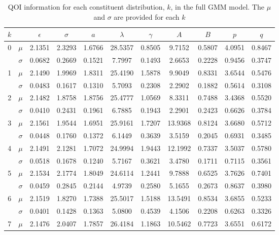 \begin{table}[ht]
	\centering
	\caption{QOI information for each constituent distribution, $k$, in the full GMM model.  The $\mu$ and $\sigma$ are provided for each $k$}
  \label{tbl:sw_all_gmm_parameters}
  \begin{tabular}{ccccccccccc}
    \hline
    $k$ & & $\epsilon$ & $\sigma$ & $a$ & $\lambda$ & $\gamma$ & $A$ & $B$ & $p$ & $q$\\
    \hline
    0 & $\mu$     & 2.1351 & 2.3293 & 1.6766 & 28.5357 & 0.8505 &  9.7152 & 0.5807 & 4.0951 & 0.8467\\
      & $\sigma$  & 0.0682 & 0.2669 & 0.1521 &  7.7997 & 0.1493 &  2.6653 & 0.2228 & 0.9456 & 0.3747\\
    1 & $\mu$     & 2.1490 & 1.9969 & 1.8311 & 25.4190 & 1.5878 &  9.9049 & 0.8331 & 3.6544 & 0.5476\\
      & $\sigma$  & 0.0483 & 0.1617 & 0.1310 &  5.7093 & 0.2308 &  2.2902 & 0.1882 & 0.5614 & 0.3108\\
    2 & $\mu$     & 2.1482 & 1.8758 & 1.8756 & 25.4777 & 1.0569 &  8.3311 & 0.7488 & 3.4368 & 0.5520\\
      & $\sigma$  & 0.0410 & 0.2431 & 0.1961 &  6.7885 & 0.1943 &  2.2901 & 0.2423 & 0.6626 & 0.3784\\
    3 & $\mu$     & 2.1561 & 1.9544 & 1.6951 & 25.9161 & 1.7207 & 13.9368 & 0.8124 & 3.6680 & 0.5712\\
      & $\sigma$  & 0.0448 & 0.1760 & 0.1372 &  6.1449 & 0.3639 &  3.5159 & 0.2045 & 0.6931 & 0.3485\\
    4 & $\mu$     & 2.1491 & 2.1281 & 1.7072 & 24.9994 & 1.9443 & 12.1992 & 0.7337 & 3.5037 & 0.5780\\
      & $\sigma$  & 0.0518 & 0.1678 & 0.1240 &  5.7167 & 0.3621 &  3.4780 & 0.1711 & 0.7115 & 0.3561\\
    5 & $\mu$     & 2.1534 & 2.1774 & 1.8049 & 24.6114 & 1.2441 &  9.7888 & 0.6525 & 3.7626 & 0.7401\\
      & $\sigma$  & 0.0459 & 0.2845 & 0.2144 &  4.9739 & 0.2580 &  5.1655 & 0.2673 & 0.8637 & 0.3980\\
    6 & $\mu$     & 2.1519 & 1.8270 & 1.7388 & 25.5017 & 1.5188 & 13.5491 & 0.8534 & 3.6855 & 0.5233\\
      & $\sigma$  & 0.0401 & 0.1428 & 0.1363 &  5.0800 & 0.4539 &  4.1506 & 0.2208 & 0.6263 & 0.3326\\
    7 & $\mu$     & 2.1476 & 2.0407 & 1.7857 & 26.4184 & 1.1863 & 10.5462 & 0.7723 & 3.6551 & 0.6172\\

\end{tabular}
\end{table}
